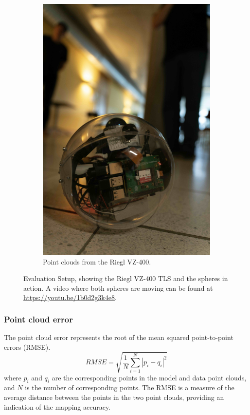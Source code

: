 \documentclass[conference]{IEEEtran}
\begin{document}
\begin{figure}[t]
\begin{subfigure}{0.48\columnwidth}
        \includegraphics[width=\textwidth]{pics/sphere_on_the_move.jpeg}
        \caption{Point clouds from the Riegl VZ-400.}
        \label{fig:sphere_on_the_move}
\end{subfigure}
\caption{Evaluation Setup, showing the Riegl VZ-400 TLS and the spheres in action. A video where both spheres are moving can be found at \url{https://youtu.be/1b0d2g3k4e8}.}

\end{figure}

\subsubsection{Point cloud error}
The point cloud error represents the root of the mean squared point-to-point errors (RMSE).
\begin{equation}
    RMSE = \sqrt{\frac{1}{N} \sum_{i=1}^{N} |p_i - q_i|^2}
\end{equation}
where \( p_i \) and \( q_i \) are the corresponding points in the model and data point clouds, and \( N\) is the number of corresponding points. The RMSE is a measure of the average distance between the points in the two point clouds, providing an indication of the mapping accuracy.
\end{document}
